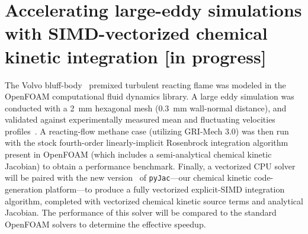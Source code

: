 \documentclass[a4paper,10pt]{article}
\begin{document}
\section{Accelerating large-eddy simulations with SIMD-vectorized chemical kinetic integration [in progress]}
The Volvo bluff-body~\cite{sjunnesson1991validation,sjunnesson1991lda} premixed turbulent reacting flame was modeled in the OpenFOAM computational fluid dynamics library.
A large eddy simulation was conducted with a \SI{2}{\milli\meter} hexagonal mesh (\SI{0.3}{\milli\meter} wall-normal distance), and validated against experimentally measured mean and fluctuating velocities profiles~\cite{sjunnesson1991validation,sjunnesson1991lda}.
A reacting-flow methane case (utilizing GRI-Mech 3.0) was then run with the stock fourth-order linearly-implicit Rosenbrock integration algorithm present in OpenFOAM (which includes a semi-analytical chemical kinetic Jacobian) to obtain a performance benchmark.
Finally, a vectorized CPU solver~\cite{STONE201818} will be paired with the new version~\cite{2018arXiv180901029C} of \texttt{pyJac}---our chemical kinetic code-generation platform---to produce a fully vectorized explicit-SIMD integration algorithm, completed with vectorized chemical kinetic source terms and analytical Jacobian.
The performance of this solver will be compared to the standard OpenFOAM solvers to determine the effective speedup.



\appendix
\setcounter{figure}{0}
\setcounter{table}{0}

\renewcommand*{\thesection}{\appendixname~\Alph{section}}
\end{document}
